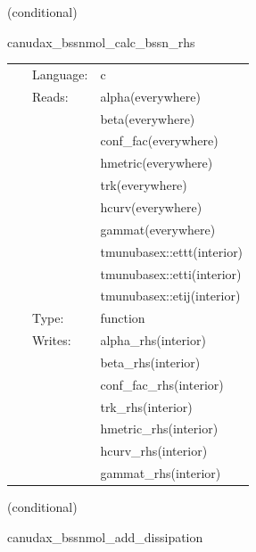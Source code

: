 \vspace{5mm}

   (conditional) 

\hspace{5mm} canudax\_bssnmol\_calc\_bssn\_rhs 

\hspace{5mm}{\it mol rhs calculation } 


\hspace{5mm}

 \begin{tabular*}{160mm}{cll} 
~ & Language:  & c \\ 
~ & Reads:  & alpha(everywhere) \\ 
~& ~ &beta(everywhere)\\ 
~& ~ &conf\_fac(everywhere)\\ 
~& ~ &hmetric(everywhere)\\ 
~& ~ &trk(everywhere)\\ 
~& ~ &hcurv(everywhere)\\ 
~& ~ &gammat(everywhere)\\ 
~& ~ &tmunubasex::ettt(interior)\\ 
~& ~ &tmunubasex::etti(interior)\\ 
~& ~ &tmunubasex::etij(interior)\\ 
~ & Type:  & function \\ 
~ & Writes:  & alpha\_rhs(interior) \\ 
~& ~ &beta\_rhs(interior)\\ 
~& ~ &conf\_fac\_rhs(interior)\\ 
~& ~ &trk\_rhs(interior)\\ 
~& ~ &hmetric\_rhs(interior)\\ 
~& ~ &hcurv\_rhs(interior)\\ 
~& ~ &gammat\_rhs(interior)\\ 
\end{tabular*} 


\vspace{5mm}

   (conditional) 

\hspace{5mm} canudax\_bssnmol\_add\_dissipation 

\hspace{5mm}{\it add ko dissipation } 


\hspace{5mm}

